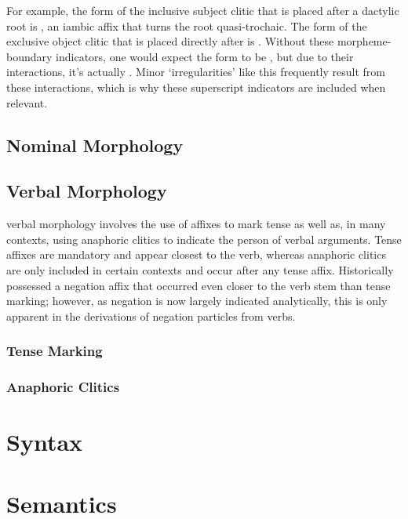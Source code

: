 \documentclass[a4paper,11pt,oneside,openany]{memoir}
\begin{document}
For example, the form of the inclusive subject clitic that is placed after a dactylic root is , an iambic affix that turns the root quasi-trochaic. The form of the exclusive object clitic that is placed directly after is . Without these morpheme-boundary indicators, one would expect the form to be , but due to their interactions, it's actually . Minor `irregularities' like this frequently result from these interactions, which is why these superscript indicators are included when relevant.

\section{Nominal Morphology}

\section{Verbal Morphology}

\parentlang{} verbal morphology involves the use of affixes to mark tense as well as, in many contexts, using anaphoric clitics to indicate the person of verbal arguments. Tense affixes are mandatory and appear closest to the verb, whereas anaphoric clitics are only included in certain contexts and occur after any tense affix. Historically \parentlang{} possessed a negation affix that occurred even closer to the verb stem than tense marking; however, as negation is now largely indicated analytically, this is only apparent in the derivations of negation particles from \parentlang{} verbs.

\subsection{Tense Marking}



\subsection{Anaphoric Clitics}

\chapter{Syntax}

\chapter{Semantics}
\end{document}

